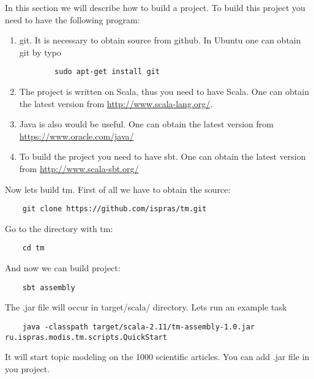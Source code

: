 In this section we will describe how to build a project. 
To build this project you need to have the following program:
\begin{enumerate}
    \item git. It is necessary to obtain source from github. 
	In Ubuntu one can obtain git by typo 
	\begin{lstlisting} 
	    sudo apt-get install git 
	\end{lstlisting}

	
    \item The project is written on Scala, thus you need to have Scala. One can obtain the latest version from \url{http://www.scala-lang.org/}. 
    
    \item Java is also would be useful. One can obtain the latest version from \url{https://www.oracle.com/java/}
    
    \item To build the project you need to have sbt. One can obtain the latest version from \url{http://www.scala-sbt.org/}
\end{enumerate}

Now lets build tm. First of all we have to obtain the source:
\begin{lstlisting}
    git clone https://github.com/ispras/tm.git 
\end{lstlisting}
Go to the directory with tm:
\begin{lstlisting}
    cd tm
\end{lstlisting}
And now we can build project:
\begin{lstlisting}
    sbt assembly
\end{lstlisting}
The .jar file will occur in target/scala/ directory. 
Lets run an example task 
\begin{lstlisting}
    java -classpath target/scala-2.11/tm-assembly-1.0.jar ru.ispras.modis.tm.scripts.QuickStart
\end{lstlisting}
It will start topic modeling on the 1000 scientific articles. You can add .jar file in you 
project.

